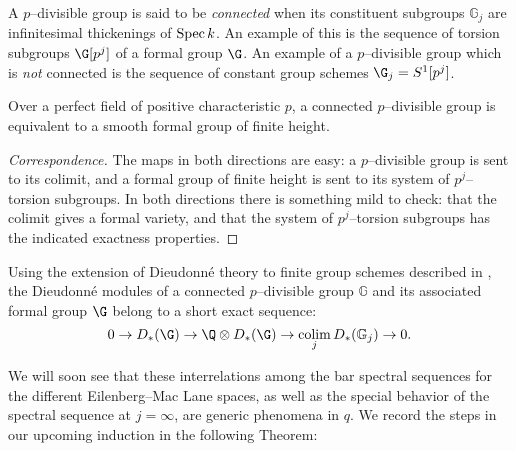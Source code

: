 \begin{definition}
A \(p\)--divisible group is said to be \textit{connected} when its constituent subgroups \(\mathbb G_j\) are infinitesimal thickenings of \(\operatorname{Spec} k\).  An example of this is the sequence of torsion subgroups \(\G[p^j]\) of a formal group \(\G\).  An example of a \(p\)--divisible group which is \emph{not} connected is the sequence of constant group schemes \(\G_j = S^1[p^j]\).
\end{definition}

\begin{lemma}
Over a perfect field of positive characteristic \(p\), a connected \(p\)--divisible group is equivalent to a smooth formal group of finite height.
\end{lemma}
\begin{proof}[Correspondence]
The maps in both directions are easy: a \(p\)--divisible group is sent to its colimit, and a formal group of finite height is sent to its system of \(p^j\)--torsion subgroups.  In both directions there is something mild to check: that the colimit gives a formal variety, and that the system of \(p^j\)--torsion subgroups has the indicated exactness properties.
\end{proof}

\begin{remark}\label{DieudonneModsForPDivVsFormal}
Using the extension of Dieudonn\'e theory to finite group schemes described in , the Dieudonn\'e modules of a connected \(p\)--divisible group \(\mathbb G\) and its associated formal group \(\G\) belong to a short exact sequence: \[0 \to D_*(\G) \to \Q \otimes D_*(\G) \to \colim_j D_*(\mathbb G_j) \to 0.\]
\end{remark}

We will soon see that these interrelations among the bar spectral sequences for the different Eilenberg--Mac Lane spaces, as well as the special behavior of the spectral sequence at \(j = \infty\), are generic phenomena in \(q\).  We record the steps in our upcoming induction in the following Theorem:

